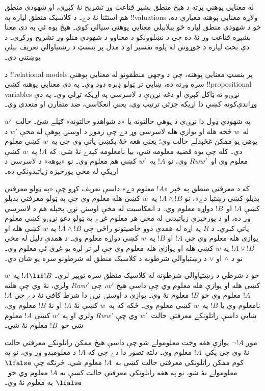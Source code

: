 \documentclass[../../../include/open-logic-section]{subfiles}
\begin{document}


له معنايي پوهنې پرته د هېڅ منطق بشپړ قناعت وړ تشريح نۀ کېږي، او
شهودي منطق هم استثنا نۀ دے۔ د کلاسيک منطق لپاره په !!{valuation}s
ولاړه معنايي پوهنه معياري ده، خو د شهودي منطق لپاره څو بېلابېلې
معنايي پوهنې سيالي کوي۔ هېڅ يوه ئې په دې معنا بشپړه قناعت وړ نۀ ده
چې د نښلوونکو د معناوو د شهودي منلو وړ تشريح ورکړي۔ د دې بحث لپاره د جوړونې له پلوه تفسير او
د مدل پر بنسټ د رښتياوالي تعريف بېلې پوښتنې دي۔

د !!{relational model}s پر بنسټ معنايي پوهنه، چې د وجهي منطقونو له
معنايي پوهنې سره ورته ده، ښايي تر ټولو ډېره دود وي۔ په دې معنايي
پوهنه کښې !!{propositional variable}s نړۍو ته ټاکل کېږي او دغه
نړۍې د لاسرسي په اړيکه تړلې وي۔ په دې وړاندې‌کونه کښې دا اړيکه جزئي ترتيب وي، يعنې
انعکاسي، ضد متقارن او متعدي وي۔

په شهودي ډول دا نړۍې د پوهې حالتونه يا «د شواهدو حالتونه» ګڼلے شئ۔
حالت~$w'$ له~$w$ څخه هله او يوازې هله لاسرسي وړ دے چې زموږ د
اوسنۍ پوهې له مخې $w'$ د پوهې يو ممکن غځېدلے حالت وي؛ يعنې
هغه څۀ پکښې پاتې وي چې په~$w$ کښې معلوم دي۔ کله چې يوه قضيه
معلومه شي، بيا نامعلومه کېدے نۀ شي: که $!A$ په~$w$ کښې معلوم وي
او~$Rww'$ وي، نو $!A$ په~$w'$ کښې هم معلوم وي۔ نو «پوهه» د
لاسرسي د اړيکې له مخې يورخيزه زياتېدونکې ده۔

که د معرفتي منطق په څېر «$!A$ معلوم دے» داسې تعريف کړو چې «په ټولو
معرفتي بديلو کښې رښتيا دے»، نو $!A \land !B$ په~$w$ کښې هله
معلوم وي چې په ټولو معرفتي بديلو کښې $!A$ او~$!B$ دواړه معلوم وي۔
د انعکاسيت له مخې اوسنۍ نړۍ پخپله هم د لاسرسي وړ ده، او
د يورخيزې زياتېدنې له مخې هر معلوم غړے په ټولو دغو نړۍو کښې
معلوم پاتې کېږي۔ د $R$ په اړه له همدې دوو خاصيتونو راځي
چې $!A \land !B$ په $w$ کښې هله او يوازې هله معلوم وي چې $!A$
او $!B$ په~$w$ کښې دواړه معلوم وي۔ د همدې دليل له مخې
$!A \lor !B$ په $w$ کښې هله او يوازې هله معلوم وي چې لږ تر لږه
يو غړی ئې معلوم وي۔ نو د $\land$ او $\lor$ د رښتياوالي شرطونه
د کلاسيک منطق له شرطونو سره يو شان دي۔

خو د شرطي د رښتياوالي شرطونه له کلاسيک منطق سره توپير لري۔
$!A \lif !B$ په~$w$ کښې هله او يوازې هله معلوم وي چې داسې هېڅ
$w'$، چې $Rww'$ ولري، نۀ وي چې هلته $!A$ معلوم وي خو $!B$
معلوم نۀ وي۔ يوازې د اوسنۍ نړۍ دا شرط کافي نۀ دے چې $!A$ نامعلوم وي
يا $!B$ په~$w$ کښې معلوم وي۔ ځکه که په~$w$ کښې نۀ $!A$
او نۀ $!B$ معلوم وي، ښايي داسې راتلونکے معرفتي حالت~$w'$ وي
چې $Rww'$ ولري او په $w'$ کښې $!A$ معلوم شي خو~$!B$ معلوم نۀ شي۔

موږ $\lnot !A$ يوازې هغه وخت معلومولے شو چې داسې هېڅ ممکن
راتلونکے معرفتي حالت نۀ وي چې پکې~$!A$ معلوم وي۔ دلته تصور دا دے
چې که $!A$ د معلومېدو وړ وي، نو په کوم ممکن راتلونکي معرفتي حالت
کښې به~$!A$ معلوم شي۔ څرنګه چې $\lfalse$ معلومولے نۀ شو، نو
په هغه راتلونکي معرفتي حالت کښې به $!A$ معلوم وي خو~$\lfalse$
به معلوم نۀ وي۔
\end{document}
